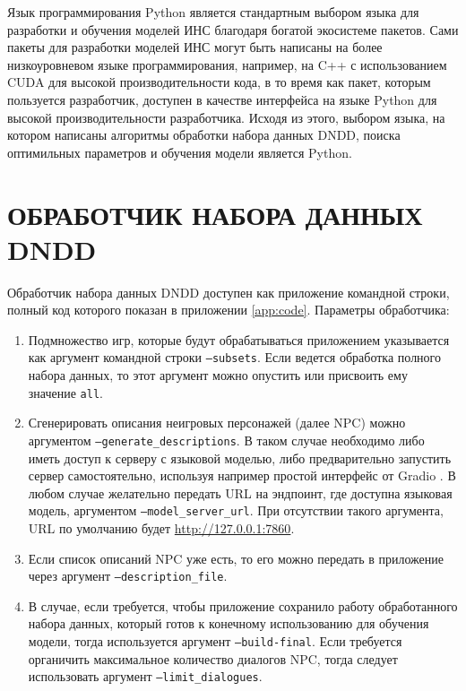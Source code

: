 Язык программирования Python \cite{python-lang-site} является стандартным выбором языка для разработки и обучения моделей ИНС благодаря богатой экосистеме пакетов. Сами пакеты для разработки моделей ИНС могут быть написаны на более низкоуровневом языке программирования, например, на C++ \cite{cpp-docs} с использованием CUDA \cite{cuda-docs} для высокой производительности кода, в то время как пакет, которым пользуется разработчик, доступен в качестве интерфейса на языке Python для высокой производительности разработчика. Исходя из этого, выбором языка, на котором написаны алгоритмы обработки набора данных DNDD, поиска оптимильных параметров и обучения модели является Python.

\section{ОБРАБОТЧИК НАБОРА ДАННЫХ DNDD}
Обработчик набора данных DNDD доступен как приложение командной строки, полный код которого показан в приложении \ref{app:code}. Параметры обработчика:
\begin{enumerate}
    \item Подмножество игр, которые будут обрабатываться приложением указывается как аргумент командной строки \texttt{--subsets}. Если ведется обработка полного набора данных, то этот аргумент можно опустить или присвоить ему значение \texttt{all}.
    \item Сгенерировать описания неигровых персонажей (далее NPC) можно аргументом \texttt{--generate\_descriptions}. В таком случае необходимо либо иметь доступ к серверу с языковой моделью, либо предварительно запустить сервер самостоятельно, используя например простой интерфейс от Gradio \cite{gradio-docs}. В любом случае желательно передать URL на эндпоинт, где доступна языковая модель, аргументом \texttt{--model\_server\_url}. При отсутствии такого аргумента, URL по умолчанию будет \url{http://127.0.0.1:7860}.
    \item Если список описаний NPC уже есть, то его можно передать в приложение через аргумент \texttt{--description\_file}.
    \item В случае, если требуется, чтобы приложение сохранило работу обработанного набора данных, который готов к конечному использованию для обучения модели, тогда используется аргумент \texttt{--build-final}. Если требуется органичить максимальное количество диалогов NPC, тогда следует использовать аргумент \texttt{--limit\_dialogues}.
\end{enumerate}

